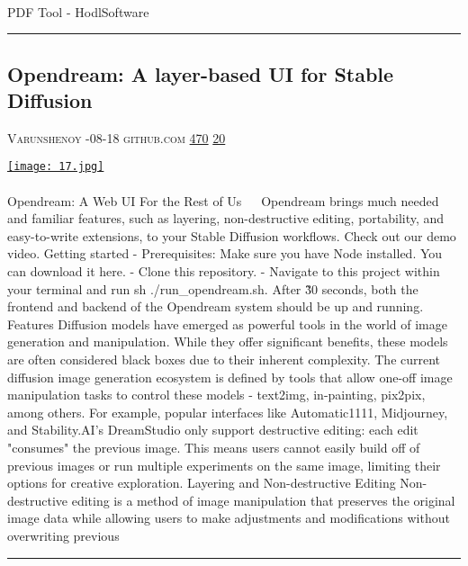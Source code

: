 \documentclass[10pt,a4paper]{article}
\begin{document}
\begin{multicols}{2}
\paragraph{}
PDF Tool - HodlSoftware
\par\noindent\textcolor{red}{\rule{\linewidth}{0.2mm}}
\vfill
\null
\noindent\begin{minipage}{\linewidth}
\subsection{Opendream: A layer-based UI for Stable Diffusion}
\textsc{\footnotesize
{\scriptsize\faUser}\space 
Varunshenoy 
{\scriptsize\faCalendar}-08-18 
{\scriptsize\faGithub}\space 
github.com 
{\scriptsize\faThumbsOUp}\space 
\href{http://news.ycombinator.com/item?id=37136898\&utm\_term=comment}{470} 
{\scriptsize\faComments}\space 
\href{http://news.ycombinator.com/item?id=37136898\&utm\_term=comment}{20} 
}
\par\medskip\noindent
\href{https://github.com/varunshenoy/opendream?utm\_source=hackernewsletter\&utm\_medium=email\&utm\_term=show\_hn}{
    \texttt{[image: 17.jpg]}
}
\end{minipage}
\paragraph{}
Opendream: A Web UI For the Rest of Us 💭 🎨
Opendream brings much needed and familiar features, such as layering, non-destructive editing, portability, and easy-to-write extensions, to your Stable Diffusion workflows. Check out our demo video.
Getting started
- Prerequisites: Make sure you have Node installed. You can download it here.
- Clone this repository.
- Navigate to this project within your terminal and run
sh ./run\_opendream.sh. After \~30 seconds, both the frontend and backend of the Opendream system should be up and running.
Features
Diffusion models have emerged as powerful tools in the world of image generation and manipulation. While they offer significant benefits, these models are often considered black boxes due to their inherent complexity. The current diffusion image generation ecosystem is defined by tools that allow one-off image manipulation tasks to control these models - text2img, in-painting, pix2pix, among others.
For example, popular interfaces like Automatic1111, Midjourney, and Stability.AI's DreamStudio only support destructive editing: each edit "consumes" the previous image. This means users cannot easily build off of previous images or run multiple experiments on the same image, limiting their options for creative exploration.
Layering and Non-destructive Editing
Non-destructive editing is a method of image manipulation that preserves the original image data while allowing users to make adjustments and modifications without overwriting previous 
\par\noindent\textcolor{red}{\rule{\linewidth}{0.2mm}}
\vfill
\null
\noindent\begin{minipage}{\linewidth}

\end{minipage}
\end{multicols}
\end{document}
